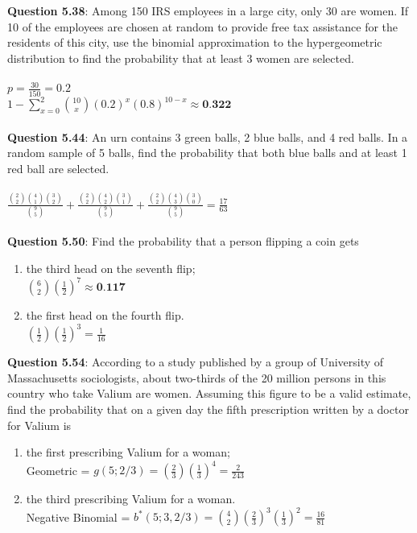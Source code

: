 \documentclass{article}
\begin{document}
    \textbf{Question 5.38}: Among 150 IRS employees in a large city, only
    30 are women. If 10 of the employees are chosen at
    random to provide free tax assistance for the residents
    of this city, use the binomial approximation to the hypergeometric 
    distribution to find the probability that
    at least 3 women are selected.\\\\
        \indent $p = \frac{30}{150} = 0.2$\\
        \indent $1 - \sum_{x=0}^{2}\binom{10}{x}(0.2)^{x}(0.8)^{10-x} \approx \textbf{0.322}$\\\\
    \textbf{Question 5.44}: An urn contains 3 green balls, 2 blue balls, and
    4 red balls. In a random sample of 5 balls, find the
    probability that both blue balls and at least 1 red ball
    are selected.\\\\
        \indent $\frac{\binom{2}{2}\binom{4}{1}\binom{3}{2}}{\binom{9}{5}} + \frac{\binom{2}{2}\binom{4}{2}\binom{3}{1}}{\binom{9}{5}} + \frac{\binom{2}{2}\binom{4}{3}\binom{3}{0}}{\binom{9}{5}} = \frac{17}{63}$\\\\
    \textbf{Question 5.50}: Find the probability that a person flipping a coin
    gets
        \begin{enumerate}[label = (\alph*)]
            \item the third head on the seventh flip;\\
                \indent $\binom{6}{2}(\frac{1}{2})^7 \approx \textbf{0.117}$
            \item the first head on the fourth flip.\\
                \indent $(\frac{1}{2})(\frac{1}{2})^3 = \frac{1}{16}$
        \end{enumerate}
    \textbf{Question 5.54}: According to a study published by a group of
    University of Massachusetts sociologists, about two-thirds 
    of the 20 million persons in this country who
    take Valium are women. Assuming this figure to be a
    valid estimate, find the probability that on a given day
    the fifth prescription written by a doctor for Valium is
        \begin{enumerate}[label = (\alph*)]
            \item the first prescribing Valium for a woman;\\
                \indent Geometric = $g(5;2/3) = (\frac{2}{3})(\frac{1}{3})^4 = \frac{2}{243}$
            \item the third prescribing Valium for a woman.\\
                \indent Negative Binomial = $b^*(5;3,2/3) = \binom{4}{2}(\frac{2}{3})^3(\frac{1}{3})^2 = \frac{16}{81}$
        \end{enumerate}
\end{document}
